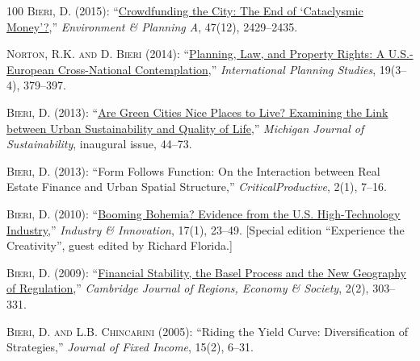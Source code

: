 \documentclass[letter,11pt]{article}
\begin{document}
\begin{thebibliography}{100}
\textsc{Bieri, D.} (2015): \enquote{\href{http://epn.sagepub.com/content/47/12/2429?etoc}{Crowdfunding the City: The End of \enquote{Cataclysmic Money}?},} \emph{Environment \& Planning A}, 47(12), 2429--2435.

\textsc{Norton, R.K.  {\small and} D. Bieri} (2014): \enquote{\leavevmode\href{http://www.tandfonline.com/doi/abs/10.1080/13563475.2014.965249}{Planning, Law, and Property Rights: A U.S.-European Cross-National Contemplation},} \emph{International Planning Studies}, 19(3--4), 379--397.

\textsc{Bieri, D.}  (2013): \enquote{\href{http://quod.lib.umich.edu/m/mjs/12333712.0001.006?view=text;rgn=main}{Are Green Cities Nice Places to Live? Examining the Link between Urban Sustainability and Quality of Life},} \emph{Michigan Journal of Sustainability}, inaugural issue, 44--73.

\textsc{Bieri, D.}  (2013): \enquote{Form Follows Function: On the Interaction between Real Estate Finance and Urban Spatial Structure,} \emph{CriticalProductive}, 2(1), 7--16.

\textsc{Bieri, D.}  (2010): \enquote{\href{http://www.informaworld.com/smpp/title~db=all~content=g919501831~tab=toc}{Booming Bohemia? Evidence from the U.S. High-Technology Industry},} \emph{Industry \& Innovation}, 17(1), 23--49. [Special edition \enquote{Experience the Creativity}, guest edited by Richard Florida.]

\textsc{Bieri, D.}  (2009): \enquote{\href{http://cjres.oxfordjournals.org/cgi/content/abstract/rsp004?ijkey=7ecp1XJIWF7bpTB&keytype=ref}{Financial Stability, the {B}asel Process and the New Geography of Regulation},} \emph{Cambridge Journal of Regions, Economy \& Society}, 2(2), 303--331.

\textsc{Bieri, D.  {\small and} L.B. Chincarini}  (2005): \enquote{Riding the Yield Curve: Diversification of Strategies,} \emph{Journal of Fixed Income}, 15(2), 6--31.
\end{thebibliography}
\endgroup
\end{document}

